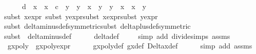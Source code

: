 \begin{isabellebody}
\ \ \ \ \ d\ {\isacharasterisk}\ {\isacharparenleft}x{}\ {\isacharasterisk}\ x{}\ {\isacharminus}\ c\ {\isacharasterisk}\ y{}\ {\isacharasterisk}\ y{}{\isacharparenright}\ {\isacharasterisk}\ {\isacharparenleft}x{}\ {\isacharasterisk}\ y{}\ {\isacharplus}\ y{}\ {\isacharasterisk}\ x{}{\isacharparenright}\ {\isacharasterisk}\ x{}\ {\isacharasterisk}\ y{}{\isacharparenright}{\isachardoublequoteclose}\isanewline
\ \ \ \ \isamarkupfalse%
{\isacharparenleft}{\isacharparenleft}subst\ x{}{\isacharprime}{\isacharunderscore}expr{\isacharparenright}{\isacharplus}{\isacharcomma}\ {\isacharparenleft}subst\ y{}{\isacharprime}{\isacharunderscore}expr{\isacharparenright}{\isacharplus}{\isacharcomma}{\isacharparenleft}subst\ x{}{\isacharprime}{\isacharunderscore}expr{\isacharparenright}{\isacharplus}{\isacharcomma}{\isacharparenleft}subst\ y{}{\isacharprime}{\isacharunderscore}expr{\isacharparenright}{\isacharplus}{\isacharparenright}\isanewline
\ \ \ \ \isamarkupfalse%
{\isacharparenleft}{\isacharparenleft}subst\ delta{\isacharunderscore}minus{\isacharunderscore}def{\isacharbrackleft}symmetric{\isacharbrackright}{\isacharparenright}{\isacharplus}{\isacharcomma}{\isacharparenleft}subst\ delta{\isacharunderscore}plus{\isacharunderscore}def{\isacharbrackleft}symmetric{\isacharbrackright}{\isacharparenright}{\isacharplus}{\isacharparenright}\isanewline
\ \ \ \ \isamarkupfalse%
{\isacharparenleft}subst\ {\isacharparenleft}{}{\isacharparenright}\ delta{\isacharunderscore}minus{\isacharunderscore}def{\isacharparenright}\isanewline
\ \ \ \ \isamarkupfalse%
\ delta{\isacharunderscore}def\isanewline
\ \ \ \ \isamarkupfalse%
{\isacharparenleft}simp\ add{\isacharcolon}\ divide{\isacharunderscore}simps\ assms{\isacharparenleft}{}{\isacharminus}{}{\isacharparenright}{\isacharparenright}\isanewline
\isanewline
\ \ \isamarkupfalse%
\ {\isachardoublequoteopen}gxpoly\ {\isacharequal}\ gxpoly{\isacharunderscore}expr{\isachardoublequoteclose}\isanewline
\ \ \ \ \isamarkupfalse%
\ gxpoly{\isacharunderscore}def\ g\isactrlsub x{\isacharunderscore}def\ Delta\isactrlsub x{\isacharunderscore}def\ \isanewline
\ \ \ \ \isamarkupfalse%
{\isacharparenleft}simp\ add{\isacharcolon}\ assms{\isacharparenleft}{}{\isacharcomma}{}{\isacharparenright}{\isacharparenright}\isanewline

\end{isabellebody}
